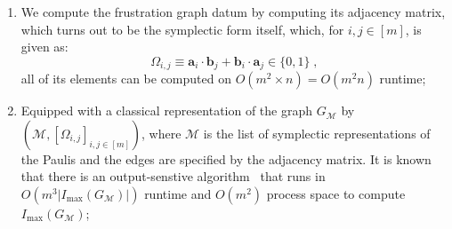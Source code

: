 \documentclass[10pt,aps,pra,twocolumn,floatfix,nofootinbib,superscriptaddress,longbibliography]{revtex4-2}
\newcommand{\1}{\mathbbm{1}}
\begin{document}
\begin{enumerate}
    \item We compute the frustration graph datum by computing its adjacency matrix, which turns out to be the symplectic form itself, which, for $i,j \in [m]$, is given as:
    \begin{equation}
        \Omega_{i,j} \equiv \mathbf a_i\cdot \mathbf b_j+ \mathbf b_i \cdot\mathbf a_j \in \{0,1\}\;,   
    \end{equation}
    all of its elements can be computed on $O(m^2 \times n) = O(m^2 n)$ runtime;
    \item Equipped with a classical representation of the graph $G_\mathcal M$ by $(\mathcal M, [\Omega_{i,j}]_{i,j \in [m]})$, where $\mathcal M$ is the list of symplectic representations of the Paulis and the edges are specified by the adjacency matrix. It is known that there is an output-senstive algorithm~\cite{tsukiyama1977anew} that runs in $O(m^3 |I_\mathrm{max}(G_\mathcal M)|)$ runtime and $O(m^2)$ process space to compute $I_\mathrm{max}(G_\mathcal M)$;

\end{enumerate}
\end{document}

